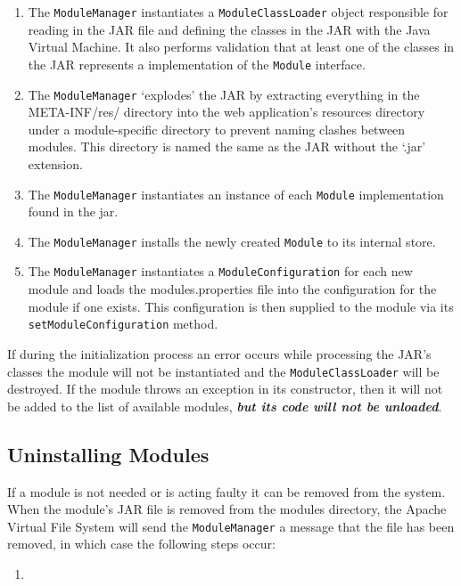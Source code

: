 \documentclass[letterpaper]{report}
\begin{document}
\begin{enumerate}
\item The \texttt{ModuleManager} instantiates a \texttt{ModuleClassLoader} object responsible for reading in the JAR file and defining the classes in the JAR with the Java Virtual Machine. It also performs validation that at least one of the classes in the JAR represents a implementation of the \texttt{Module} interface.
\item The \texttt{ModuleManager} `explodes' the JAR by extracting everything in the META-INF/res/ directory into the web application's resources directory under a module-specific directory to prevent naming clashes between modules. This directory is named the same as the JAR without the `.jar' extension.
\item The \texttt{ModuleManager} instantiates an instance of each \texttt{Module} implementation found in the jar.
\item The \texttt{ModuleManager} installs the newly created \texttt{Module} to its internal store.
\item The \texttt{ModuleManager} instantiates a \texttt{ModuleConfiguration} for each new module and loads the modules.properties file into the configuration for the module if one exists. This configuration is then supplied to the module via its \texttt{setModuleConfiguration} method.
\end{enumerate}

If during the initialization process an error occurs while processing the JAR's classes the module will not be instantiated and the \texttt{ModuleClassLoader} will be destroyed. If the module throws an exception in its constructor, then it will not be added to the list of available modules, \textbf{\textit{but its code will not be unloaded}}.

\subsection{Uninstalling Modules}
If a module is not needed or is acting faulty it can be removed from the system. When the module's JAR file is removed from the modules directory, the Apache Virtual File System will send the \texttt{ModuleManager} a message that the file has been removed, in which case the following steps occur:

\begin{enumerate}
\item 
\end{enumerate}
\end{document}
